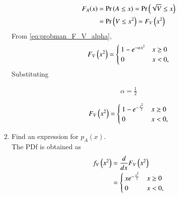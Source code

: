 \begin{enumerate}[label=\thesubsection.\arabic*.,ref=\thesubsection.\theenumi]
\begin{align} 
F_A(x) &= \Pr\left(A \le x\right) = \Pr\left(\sqrt{V} \le x\right)
\\
&= \Pr\left(V \le x^2\right) = F_V\left(x^2\right)
\end{align}
%
From \eqref{eq:probman_F_V_alpha}, 
\begin{align} 
F_V\left(x^2\right) = 
\begin{cases}
1 - e^{-\alpha x^2} & x \geq 0 \\
0 & x < 0,
\end{cases}
\end{align}
%
Substituting 

\begin{align}
\alpha = \frac{1}{2}
\end{align}

%
\begin{align} 
F_V\left(x^2\right) = 
\begin{cases}
1 - e^{- \frac{x^2}{2}} & x \geq 0 \\
0 & x < 0,
\end{cases}
\end{align}
%
\item
Find an expression for $p_{A}(x)$.
\\
\solution
The PDf is obtained as
\begin{align}
f_V\left(x^2\right) &= \frac{d}{dx}F_V\left(x^2\right)
\\
&=
\begin{cases}
x e^{- \frac{x^2}{2}} & x \geq 0 \\
0 & x < 0,
\end{cases}
\end{align}
%
\end{enumerate}

%
